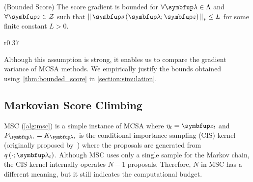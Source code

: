 \begin{assumption}{(Bounded Score)}\label{thm:bounded_score}
  The score gradient is bounded for \(\forall \vlambda \in \Lambda\) and \(\forall \vz \in \mathcal{Z}\) such that \(\norm{\vs\left(\vlambda; \vz\right)}_* \leq L \) for some finite constant \(L > 0\).
\end{assumption}
%
\begin{wrapfigure}[11]{r}{0.37\textwidth}
\begin{minipage}[c]{0.37\textwidth}
  \centering
  \begin{algorithm2e}[H]
    \DontPrintSemicolon
    \SetAlgoLined
    \caption{MSC}\label{alg:msc}
  \end{algorithm2e}
\end{minipage}
\end{wrapfigure}
%
Although this assumption is strong, it enables us to compare the gradient variance of MCSA methods.
We empirically justify the bounds obtained using~\cref{thm:bounded_score} in \cref{section:simulation}.

\vspace{-0.07in}
\subsection{Markovian Score Climbing}
\vspace{-0.07in}

MSC (\cref{alg:msc}) is a simple instance of MCSA where \(\eta_t = \vz_t\) and \(P_{\vlambda_t} = K_{\vlambda_t}\) is the conditional importance sampling (CIS) kernel (originally proposed by~\citet{andrieu_uniform_2018}) where the proposals are generated from \(q\left(\cdot; \vlambda_t\right)\).
Although MSC uses only a single sample for the Markov chain, the CIS kernel internally operates \(N-1\) proposals.
Therefore, \(N\) in MSC has a different meaning, but it still indicates the computational budget.

